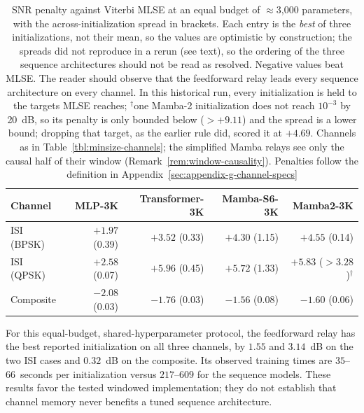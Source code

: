 \begin{table}[htbp]
\centering
\caption[Sequence architectures on channels with memory]{SNR penalty against Viterbi MLSE at an equal budget of $\approx$3{,}000 parameters, with the across-initialization spread in brackets. Each entry is the \emph{best} of three initializations, not their mean, so the values are optimistic by construction; the spreads did not reproduce in a rerun (see text), so the ordering of the three sequence architectures should not be read as resolved. Negative values beat MLSE. The reader should observe that the feedforward relay leads every sequence architecture on every channel. In this historical run, every initialization is held to the targets MLSE reaches; $^{\dagger}$one Mamba-2 initialization does not reach $10^{-3}$ by 20~dB, so its penalty is only bounded below ($>+9.11$) and the spread is a lower bound; dropping that target, as the earlier rule did, scored it at $+4.69$. Channels as in Table~\ref{tbl:minsize-channels}; the simplified Mamba relays see only the causal half of their window (Remark~\ref{rem:window-causality}). Penalties follow the definition in Appendix~\ref{sec:appendix-g-channel-specs}}\label{tbl:seq-on-memory}
\begin{tabular}{lrrrr}
\toprule
Channel & MLP-3K & Transformer-3K & Mamba-S6-3K & Mamba2-3K \\
\midrule
ISI (BPSK) & $\mathbf{+1.97}$ (0.39) & $+3.52$ (0.33) & $+4.30$ (1.15) & $+4.55$ (0.14) \\
ISI (QPSK) & $\mathbf{+2.58}$ (0.07) & $+5.96$ (0.45) & $+5.72$ (1.33) & $+5.83$ (${>}3.28$)$^{\dagger}$ \\
Composite  & $\mathbf{-2.08}$ (0.03) & $-1.76$ (0.03) & $-1.56$ (0.08) & $-1.60$ (0.06) \\
\bottomrule
\end{tabular}
\end{table}

For this equal-budget, shared-hyperparameter protocol, the feedforward relay has the best reported initialization on all three channels, by $1.55$ and $3.14$~dB on the two ISI cases and $0.32$~dB on the composite. Its observed training times are $35$--$66$~seconds per initialization versus $217$--$609$ for the sequence models. These results favor the tested windowed implementation; they do not establish that channel memory never benefits a tuned sequence architecture.

